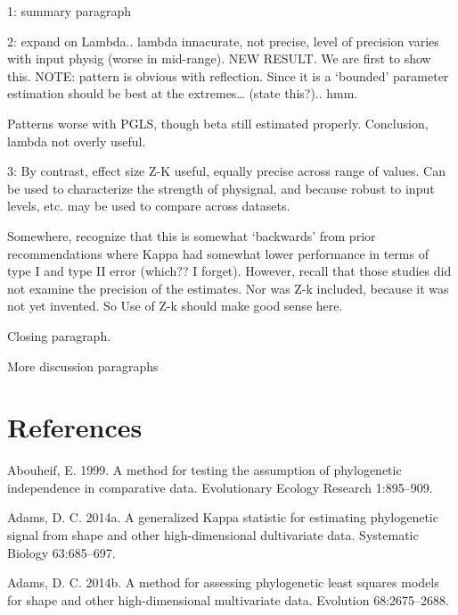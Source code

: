 \documentclass[
]{article}
\begin{document}
1: summary paragraph

2: expand on Lambda.. lambda innacurate, not precise, level of precision
varies with input physig (worse in mid-range). NEW RESULT. We are first
to show this. NOTE: pattern is obvious with reflection. Since it is a
`bounded' parameter estimation should be best at the extremes\ldots{}
(state this?).. hmm.

Patterns worse with PGLS, though beta still estimated properly.
Conclusion, lambda not overly useful.

3: By contrast, effect size Z-K useful, equally precise across range of
values. Can be used to characterize the strength of physignal, and
because robust to input levels, etc. may be used to compare across
datasets.

Somewhere, recognize that this is somewhat `backwards' from prior
recommendations where Kappa had somewhat lower performance in terms of
type I and type II error (which?? I forget). However, recall that those
studies did not examine the precision of the estimates. Nor was Z-k
included, because it was not yet invented. So Use of Z-k should make
good sense here.

Closing paragraph.

\hfill\break

More discussion paragraphs

\newpage

\hypertarget{references}{%
\section{References}\label{references}}

\setlength{\parindent}{-0.25in} \setlength{\leftskip}{0.25in}
\setlength{\parskip}{8pt} \noindent

\hypertarget{refs}{}
\leavevmode\hypertarget{ref-Abouheif1999}{}%
Abouheif, E. 1999. A method for testing the assumption of phylogenetic
independence in comparative data. Evolutionary Ecology Research
1:895--909.

\leavevmode\hypertarget{ref-Adams2014a}{}%
Adams, D. C. 2014a. A generalized Kappa statistic for estimating
phylogenetic signal from shape and other high-dimensional dultivariate
data. Systematic Biology 63:685--697.

\leavevmode\hypertarget{ref-Adams2014b}{}%
Adams, D. C. 2014b. A method for assessing phylogenetic least squares
models for shape and other high-dimensional multivariate data. Evolution
68:2675--2688.
\end{document}
